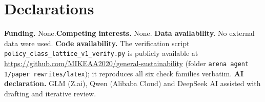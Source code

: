 \documentclass[10pt,twocolumn]{article}
\theoremstyle{definition}
\begin{document}
\section*{Declarations}
\textbf{Funding.} None.\quad \textbf{Competing interests.} None.\quad
\textbf{Data availability.} No external data were used.\quad
\textbf{Code availability.} The verification script
\texttt{policy\_class\_lattice\_v1\_verify.py} is publicly available at
\url{https://github.com/MIKEAA2020/general-sustainability} (folder
\texttt{arena agent 1/paper rewrites/latex}); it reproduces all six check
families verbatim.\quad
\textbf{AI declaration.} GLM (Z.ai), Qwen (Alibaba Cloud) and DeepSeek AI
assisted with drafting and iterative review.
\end{document}

